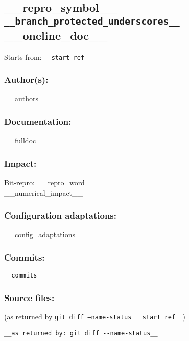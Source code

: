 \newpage
\subsection{__repro_symbol__ --- \texttt{__branch_protected_underscores__} \\ __oneline_doc__}
\label{branch:__branch__}
Starts from: \texttt{__start_ref__}

\subsubsection*{Author(s):}
__authors__

\subsubsection*{Documentation:}
__fulldoc__

\subsubsection*{Impact:}
\noindent Bit-repro: __repro_word__\\
__numerical_impact__

\subsubsection*{Configuration adaptations:}
__config_adaptations__

\subsubsection*{Commits:}
\begin{lstlisting}
__commits__
\end{lstlisting}

\subsubsection*{Source files:}
(as returned by \texttt{git diff --name-status __start_ref__})\\
\begin{lstlisting}
__as returned by: git diff --name-status__
\end{lstlisting}
